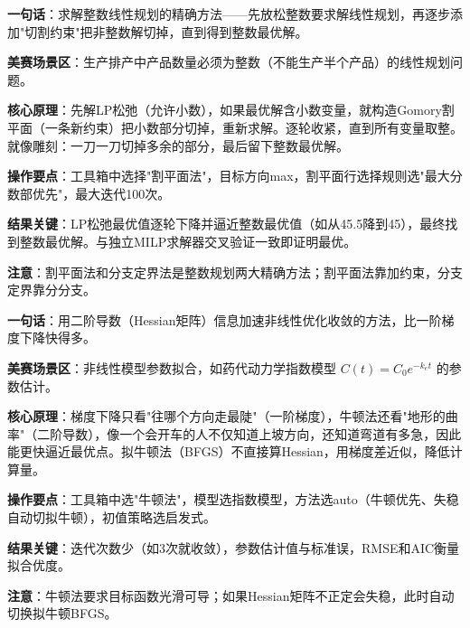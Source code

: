 
\begin{algobrief}
\textbf{一句话}：求解整数线性规划的精确方法——先放松整数要求解线性规划，再逐步添加"切割约束"把非整数解切掉，直到得到整数最优解。

\textbf{美赛场景区}：生产排产中产品数量必须为整数（不能生产半个产品）的线性规划问题。

\textbf{核心原理}：先解LP松弛（允许小数），如果最优解含小数变量，就构造Gomory割平面（一条新约束）把小数部分切掉，重新求解。逐轮收紧，直到所有变量取整。就像雕刻：一刀一刀切掉多余的部分，最后留下整数最优解。

\textbf{操作要点}：工具箱中选择"割平面法"，目标方向max，割平面行选择规则选"最大分数部优先"，最大迭代100次。

\textbf{结果关键}：LP松弛最优值逐轮下降并逼近整数最优值（如从45.5降到45），最终找到整数最优解。与独立MILP求解器交叉验证一致即证明最优。

\textbf{注意}：割平面法和分支定界法是整数规划两大精确方法；割平面法靠加约束，分支定界靠分分支。
\end{algobrief}


\begin{algobrief}
\textbf{一句话}：用二阶导数（Hessian矩阵）信息加速非线性优化收敛的方法，比一阶梯度下降快得多。

\textbf{美赛场景区}：非线性模型参数拟合，如药代动力学指数模型 $C(t)=C_0 e^{-k_e t}$ 的参数估计。

\textbf{核心原理}：梯度下降只看"往哪个方向走最陡"（一阶梯度），牛顿法还看"地形的曲率"（二阶导数），像一个会开车的人不仅知道上坡方向，还知道弯道有多急，因此能更快逼近最优点。拟牛顿法（BFGS）不直接算Hessian，用梯度差近似，降低计算量。

\textbf{操作要点}：工具箱中选"牛顿法"，模型选指数模型，方法选auto（牛顿优先、失稳自动切拟牛顿），初值策略选启发式。

\textbf{结果关键}：迭代次数少（如3次就收敛），参数估计值与标准误，RMSE和AIC衡量拟合优度。

\textbf{注意}：牛顿法要求目标函数光滑可导；如果Hessian矩阵不正定会失稳，此时自动切换拟牛顿BFGS。
\end{algobrief}


